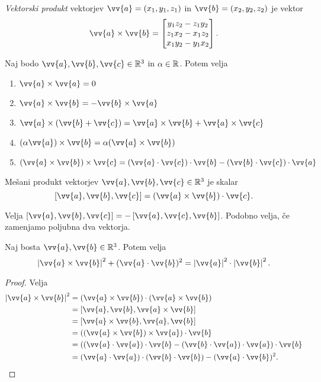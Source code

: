 \documentclass[12pt, a4paper]{article}
\begin{document}
\begin{okvir}
\begin{definicija}
\emph{Vektorski produkt} vektorjev $\vv{a}=(x_1,y_1,z_1)$ in $\vv{b}=(x_2,y_2,z_2)$ je vektor
\[
\vv{a}\times\vv{b}=
\begin{bmatrix}
y_1z_2-z_1y_2 \\
z_1x_2-x_1z_2 \\
x_1y_2-y_1x_2
\end{bmatrix}.
\]
\end{definicija}
\end{okvir}

\begin{posledica}
Naj bodo $\vv{a},\vv{b},\vv{c}\in\R^3$ in $\alpha\in\mathbb{R}$. Potem velja

\begin{enumerate}[label=\roman*)]
\item $\vv{a}\times\vv{a}=0$
\item $\vv{a}\times\vv{b}=-\vv{b}\times\vv{a}$
\item $\vv{a}\times(\vv{b}+\vv{c})=\vv{a}\times\vv{b}+\vv{a}\times\vv{c}$
\item $(\alpha\vv{a})\times\vv{b}=\alpha(\vv{a}\times\vv{b})$
\item $(\vv{a}\times\vv{b})\times\vv{c}=(\vv{a}\cdot\vv{c})\cdot\vv{b}-(\vv{b}\cdot\vv{c})\cdot\vv{a}$
\end{enumerate}
\end{posledica}

\begin{definicija}
Mešani produkt vektorjev $\vv{a},\vv{b},\vv{c}\in\R^3$ je skalar
\[
\left[\vv{a},\vv{b},\vv{c}\right]=(\vv{a}\times\vv{b})\cdot\vv{c}.
\]
\end{definicija}

\begin{trditev}
Velja $\left[\vv{a},\vv{b},\vv{c}\right]=-\left[\vv{a},\vv{c},\vv{b}\right]$. Podobno velja, če zamenjamo poljubna dva vektorja.
\end{trditev}

\begin{trditev}
Naj bosta $\vv{a},\vv{b}\in\R^3$. Potem velja
\[
\left|\vv{a}\times\vv{b}\right|^2+(\vv{a}\cdot\vv{b})^2=\left|\vv{a}\right|^2\cdot\left|\vv{b}\right|^2.
\]
\end{trditev}

\begin{proof}
Velja
\begin{align*}
\left|\vv{a}\times\vv{b}\right|^2&=(\vv{a}\times\vv{b})\cdot(\vv{a}\times\vv{b})
\\
&=\left[\vv{a},\vv{b},\vv{a}\times\vv{b}\right]
\\
&=\left[\vv{a}\times\vv{b},\vv{a},\vv{b}\right]
\\
&=((\vv{a}\times\vv{b})\times\vv{a})\cdot\vv{b}
\\
&=((\vv{a}\cdot\vv{a})\cdot\vv{b}-(\vv{b}\cdot\vv{a})\cdot\vv{a})\cdot\vv{b}
\\
&=(\vv{a}\cdot\vv{a})\cdot(\vv{b}\cdot\vv{b})-(\vv{a}\cdot\vv{b})^2.\qedhere
\end{align*}
\end{proof}
\end{document}
